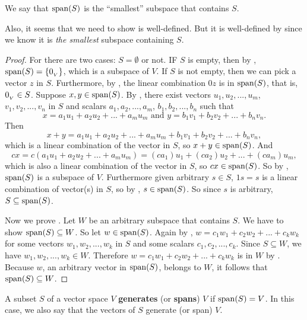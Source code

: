 \begin{note}
We say that \(\operatorname{span}(S)\) is the ``smallest'' subspace that contains \(S\).

Also, it seems that we need to show  is well-defined.
But it is well-defined by  since we know it is \emph{the smallest} subspace containing \(S\).
\end{note}

\begin{proof}
For  there are two cases: \(S = \emptyset\) or not.
IF \(S\) is empty, then by , \(\operatorname{span}(S) = \{ 0_{_V} \}\), which is a subspace of \(V\).
If \(S\) is not empty, then we can pick a vector \(z\) in \(S\).
Furthermore, by , the linear combination \(0z\) is in \(\operatorname{span}(S)\), that is, \(0_{_V} \in S\).
Suppose \(x, y \in \operatorname{span}(S)\).
By , there exist vectors \(u_1, u_2, ..., u_m\), \(v_1, v_2, ..., v_n\) in \(S\) and scalars \(a_1, a_2, ..., a_m\), \(b_1, b_2, ..., b_n\) such that
\[
    x = a_1 u_1 + a_2 u_2 + ... + a_m u_m \text{ and } y = b_1 v_1 + b_2 v_2 + ... + b_n v_n.
\]
Then
\[
    x + y = a_1 u_1 + a_2 u_2 + ... + a_m u_m + b_1 v_1 + b_2 v_2 + ... + b_n v_n,
\]
which is a linear combination of the vector in \(S\), so \(x + y \in \operatorname{span}(S)\).
And
\[
    cx = c(a_1 u_1 + a_2 u_2 + ... + a_m u_m) = (c a_1) u_1 + (c a_2) u_2 + ... + (c a_m) u_m,
\]
which is also a linear combination of the vector in \(S\), so \(cx \in \operatorname{span}(S)\).
So by , \(\operatorname{span}(S)\) is a subspace of \(V\).
Furthermore given arbitrary \(s \in S\), \(1s = s\) is a linear combination of vector(s) in \(S\), so by , \(s \in \operatorname{span}(S)\).
So since \(s\) is arbitrary, \(S \subseteq \operatorname{span}(S)\).

Now we prove .
Let \(W\) be an arbitrary subspace that contains \(S\).
We have to show \(\operatorname{span}(S) \subseteq W\).
So let \(w \in \operatorname{span}(S)\).
Again by , \(w = c_1 w_1 + c_2 w_2 + ... + c_k w_k\) for some vectors \(w_1, w_2, ..., w_k\) in \(S\) and some scalars \(c_1, c_2, ..., c_k\).
Since \(S \subseteq W\), we have \(w_1, w_2, ..., w_k \in W\).
Therefore \(w = c_1 w_1 + c_2 w_2 + ... + c_k w_k\) is in \(W\) by .
Because \(w\), an arbitrary vector in \(\operatorname{span}(S)\), belongs to \(W\), it follows that \(\operatorname{span}(S) \subseteq W\).
\end{proof}

\begin{definition} \label{def 1.5}
A subset \(S\) of a vector space \(V\) \textbf{generates} (or \textbf{spans}) \(V\) if \(\operatorname{span}(S) = V\).
In this case, we also say that the vectors of \(S\) generate (or span) \(V\).
\end{definition}


